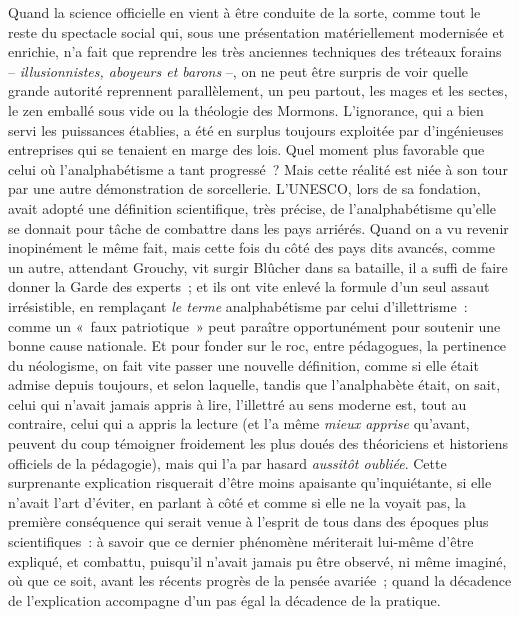 \documentclass[french,twoside]{book} %
\begin{document}
Quand la science officielle en vient à être conduite de la sorte, comme tout le reste du spectacle social qui, sous une présentation matériellement modernisée et enrichie, n’a fait que reprendre les très anciennes techniques des tréteaux forains – \emph{illusionnistes, aboyeurs et barons} –, on ne peut être surpris de voir quelle grande autorité reprennent parallèlement, un peu partout, les mages et les sectes, le zen emballé sous vide ou la théologie des Mormons. L’ignorance, qui a bien servi les puissances établies, a été en surplus toujours exploitée par d’ingénieuses entreprises qui se tenaient en marge des lois. Quel moment plus favorable que celui où l’analphabétisme a tant progressé ? Mais cette réalité est niée à son tour par une autre démonstration de sorcellerie. L’UNESCO, lors de sa fondation, avait adopté une définition scientifique, très précise, de l’analphabétisme qu’elle se donnait pour tâche de combattre dans les pays arriérés. Quand on a vu revenir inopinément le même fait, mais cette fois du côté des pays dits avancés, comme un autre, attendant Grouchy, vit surgir Blûcher dans sa bataille, il a suffi de faire donner la Garde des experts ; et ils ont vite enlevé la formule d’un seul assaut irrésistible, en remplaçant \emph{le terme} analphabétisme par celui d’illettrisme : comme un « faux patriotique » peut paraître opportunément pour soutenir une bonne cause nationale. Et pour fonder sur le roc, entre pédagogues, la pertinence du néologisme, on fait vite passer une nouvelle définition, comme si elle était admise depuis toujours, et selon laquelle, tandis que l’analphabète était, on sait, celui qui n’avait jamais appris à lire, l’illettré au sens moderne est, tout au contraire, celui qui a appris la lecture (et l’a même \emph{mieux apprise} qu’avant, peuvent du coup témoigner froidement les plus doués des théoriciens et historiens officiels de la pédagogie), mais qui l’a par hasard \emph{aussitôt oubliée}. Cette surprenante explication risquerait d’être moins apaisante qu’inquiétante, si elle n’avait l’art d’éviter, en parlant à côté et comme si elle ne la voyait pas, la première conséquence qui serait venue à l’esprit de tous dans des époques plus scientifiques : à savoir que ce dernier phénomène mériterait lui-même d’être expliqué, et combattu, puisqu’il n’avait jamais pu être observé, ni même imaginé, où que ce soit, avant les récents progrès de la pensée avariée ; quand la décadence de l’explication accompagne d’un pas égal la décadence de la pratique.\par
\end{document}
